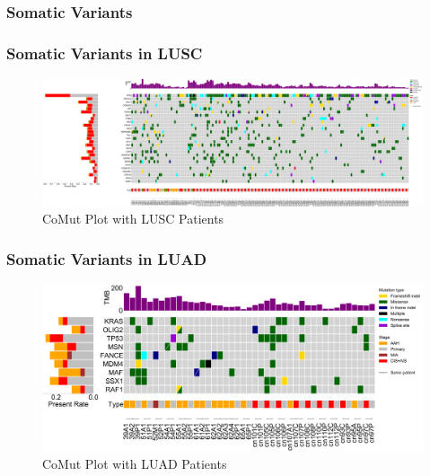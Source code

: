 \documentclass{beamer}
\begin{document}
    \subsubsection{Somatic Variants}
    \begin{frame}
        \frametitle{Somatic Variants in LUSC}

        \begin{figure}
            \includegraphics[width=\linewidth]{figures/Mutect2/BWA-SQC.pdf}
            \caption{CoMut Plot with LUSC Patients}
        \end{figure}
    \end{frame}

    \begin{frame}
        \frametitle{Somatic Variants in LUAD}

        \begin{figure}
            \includegraphics[width=\linewidth]{figures/Mutect2/BWA-ADC.pdf}
            \caption{CoMut Plot with LUAD Patients}
        \end{figure}
    \end{frame}
\end{document}
